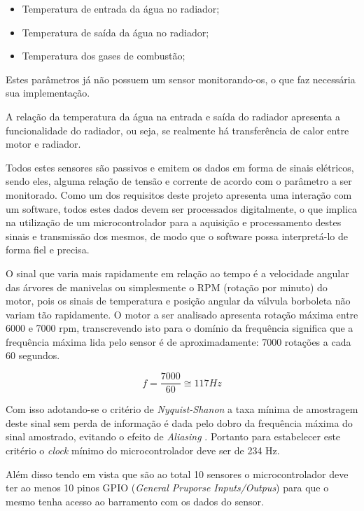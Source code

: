 \begin{itemize}
	\item Temperatura de entrada da água no radiador;
	\item Temperatura de saída da água no radiador;
	\item Temperatura dos gases de combustão;
\end{itemize}

Estes parâmetros já não possuem um sensor monitorando-os, o que faz necessária sua implementação.

A relação da temperatura da água na entrada e saída do radiador apresenta a funcionalidade do radiador, ou seja, se realmente há transferência de calor entre motor e radiador.

Todos estes sensores são passivos e emitem os dados em forma de sinais elétricos, sendo eles, alguma relação de tensão e corrente de acordo com o parâmetro a ser monitorado. Como um dos requisitos deste projeto apresenta uma interação com um software, todos estes dados devem ser processados digitalmente, o que implica na utilização de um microcontrolador para a aquisição e processamento destes sinais e transmissão dos mesmos, de modo que o software possa interpretá-lo de forma fiel e precisa. 

O sinal que varia mais rapidamente em relação ao tempo é a velocidade angular das árvores de manivelas ou simplesmente o RPM (rotação por minuto) do motor, pois os sinais de temperatura e posição angular da válvula borboleta não variam tão rapidamente. O motor a ser analisado apresenta rotação máxima entre 6000 e 7000 rpm, transcrevendo isto para o domínio da frequência significa que a frequência máxima lida pelo sensor é de aproximadamente: 7000 rotações a cada 60 segundos.

\begin{equation}
	f = \frac{7000}{60} \cong 117 Hz	
\end{equation}

Com isso adotando-se o critério de \textit{Nyquist-Shanon} \cite{diniz2014processamento} a taxa mínima de amostragem deste sinal sem perda de informação é dada pelo dobro da frequência máxima do sinal amostrado, evitando o efeito de \textit{Aliasing} \cite{diniz2014processamento}. Portanto para estabelecer este critério o \textit{clock} mínimo do microcontrolador deve ser de 234 Hz.

Além disso tendo em vista que são ao total 10 sensores o microcontrolador deve ter ao menos 10 pinos GPIO (\textit {General Pruporse Inputs/Outpus}) para que o mesmo tenha acesso ao barramento com os dados do sensor. 

